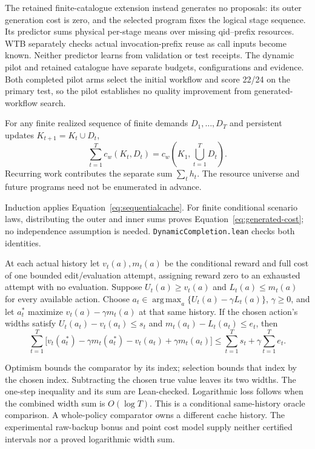 The retained finite-catalogue extension instead generates no proposals: its
outer generation cost is zero, and the selected program fixes the logical
stage sequence. Its predictor sums physical per-stage means over missing
qid--prefix resources. WTB separately checks actual invocation-prefix reuse
as call inputs become known. Neither predictor learns from validation or test
receipts. The dynamic pilot and retained catalogue have separate budgets,
configurations and evidence. Both completed pilot arms select the initial
workflow and score 22/24 on the primary test, so the pilot establishes no
quality improvement from generated-workflow search.

\begin{proposition}
\label{prop:dynamic-ledger}
For any finite realized sequence of finite demands $D_1,\ldots,D_T$ and
persistent updates $K_{t+1}=K_t\cup D_t$,
\begin{equation}
 \sum_{t=1}^T c_w(K_t,D_t)
 =c_w\!\left(K_1,\bigcup_{t=1}^T D_t\right).
 \label{eq:dynamic-ledger}
\end{equation}
Recurring work contributes the separate sum $\sum_t h_t$. The resource
universe and future programs need not be enumerated in advance.
\end{proposition}
Induction applies Equation~\eqref{eq:sequentialcache}. For finite conditional
scenario laws, distributing the outer and inner sums proves
Equation~\eqref{eq:generated-cost}; no independence assumption is needed.
\texttt{DynamicCompletion.lean} checks both identities.

\begin{proposition}
\label{prop:dynamic-optimism}
At each actual history let $v_t(a),m_t(a)$ be the conditional reward and full cost
of one bounded edit/evaluation attempt, assigning reward zero to an exhausted
attempt with no evaluation.
Suppose $U_t(a)\ge v_t(a)$ and $L_t(a)\le m_t(a)$ for every available action.
Choose $a_t\in\operatorname*{arg\,max}_a\{U_t(a)-\gamma L_t(a)\}$, $\gamma\ge0$, and let $a_t^*$
maximize $v_t(a)-\gamma m_t(a)$ at that same history. If the chosen action's
widths satisfy $U_t(a_t)-v_t(a_t)\le s_t$ and
$m_t(a_t)-L_t(a_t)\le e_t$, then
\begin{equation}
 \sum_{t=1}^T \bigl[v_t(a_t^*)-\gamma m_t(a_t^*)
                 -v_t(a_t)+\gamma m_t(a_t)\bigr]
 \le \sum_{t=1}^T s_t+\gamma\sum_{t=1}^T e_t.
 \label{eq:dynamic-width}
\end{equation}
\end{proposition}
Optimism bounds the comparator by its index; selection bounds that index by
the chosen index. Subtracting the chosen true value leaves its two widths.
The one-step inequality and its sum are Lean-checked. Logarithmic loss follows
when the combined width sum is $O(\log T)$. This is a conditional same-history
oracle comparison. A whole-policy comparator owns a different cache history.
The experimental raw-backup bonus and point cost model supply neither certified
intervals nor a proved logarithmic width sum.

